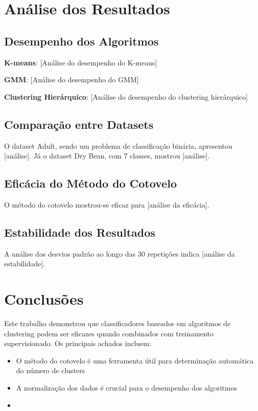 \documentclass[12pt,a4paper]{article}
\begin{document}
\section{Análise dos Resultados}

\subsection{Desempenho dos Algoritmos}

\textbf{K-means}: [Análise do desempenho do K-means]

\textbf{GMM}: [Análise do desempenho do GMM]

\textbf{Clustering Hierárquico}: [Análise do desempenho do clustering hierárquico]

\subsection{Comparação entre Datasets}

O dataset Adult, sendo um problema de classificação binária, apresentou [análise]. Já o dataset Dry Bean, com 7 classes, mostrou [análise].

\subsection{Eficácia do Método do Cotovelo}

O método do cotovelo mostrou-se eficaz para [análise da eficácia].

\subsection{Estabilidade dos Resultados}

A análise dos desvios padrão ao longo das 30 repetições indica [análise da estabilidade].

\section{Conclusões}

Este trabalho demonstrou que classificadores baseados em algoritmos de clustering podem ser eficazes quando combinados com treinamento supervisionado. Os principais achados incluem:

\begin{itemize}
    \item O método do cotovelo é uma ferramenta útil para determinação automática do número de clusters
    \item A normalização dos dados é crucial para o desempenho dos algoritmos
    \item [Outras conclusões baseadas nos resultados]
\end{itemize}
\end{document}
